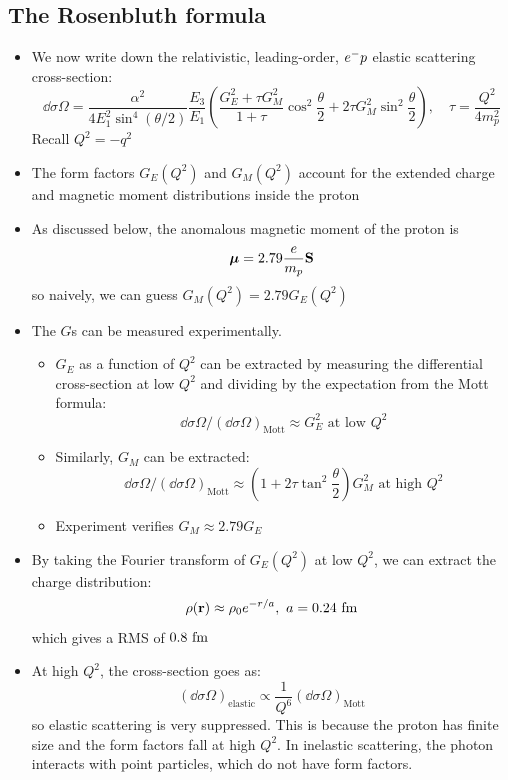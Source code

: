 \subsection{The Rosenbluth formula}
\begin{itemize}
  \item We now write down the relativistic, leading-order, $e^{-} p$ elastic scattering cross-section:
  \begin{equation}
    \dd\sigma\Omega = \frac{\alpha^2}{4E_1^2\sin^4(\theta/2)}\frac{E_3}{E_1} \left(\frac{G_E^2+\tau G_M^2}{1+\tau}\cos^2\frac\theta 2 + 2\tau G_M^2\sin^2\frac\theta 2\right), \quad \tau = \frac{Q^2}{4m_p^2}
  \end{equation}
  Recall $Q^2 = -q^2$
  \item The form factors $G_E(Q^2)$ and $G_M(Q^2)$ account for the extended charge and magnetic moment distributions inside the proton
  \item As discussed below, the anomalous magnetic moment of the proton is
  \begin{equation}
    \bm\mu = 2.79 \frac{e}{m_p}\mathbf{S}
  \end{equation}
  so naively, we can guess $G_M(Q^2) = 2.79 G_E(Q^2)$
  \item The $G$s can be measured experimentally. 
  \begin{itemize}
    \item $G_E$ as a function of $Q^2$ can be extracted by measuring the differential cross-section at low $Q^2$ and dividing by the expectation from the Mott formula:
    \begin{equation}
      \dd\sigma\Omega\Big/ \left(\dd\sigma\Omega\right)_\text{Mott} \approx G_E^2 \text{ at low }Q^2
    \end{equation}
    \item Similarly, $G_M$ can be extracted:
    \begin{equation}
      \dd\sigma\Omega\Big/ \left(\dd\sigma\Omega\right)_\text{Mott} \approx \left(1+2\tau\tan^2\frac\theta 2\right) G_M^2 \text{ at high }Q^2
    \end{equation}
    \item Experiment verifies $G_M \approx 2.79 G_E$
  \end{itemize}
  \item By taking the Fourier transform of $G_E(Q^2)$ at low $Q^2$, we can extract the charge distribution:
  \begin{equation}
    \rho(\mathbf{r}) \approx \rho_0 e^{-r/a}, ~ a = 0.24~\text{fm}
  \end{equation}
  which gives a RMS of $0.8~\text{fm}$
  \item At high $Q^2$, the cross-section goes as:
  \begin{equation}
    \left(\dd\sigma\Omega\right)_\text{elastic} \propto \frac{1}{Q^6} \left(\dd\sigma\Omega\right)_\text{Mott}
  \end{equation}
  so elastic scattering is very suppressed. This is because the proton has finite size and the form factors fall at high $Q^2$. In inelastic scattering, the photon interacts with point particles, which do not have form factors.
\end{itemize}

